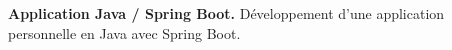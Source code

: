 
\begin{cvparagraph}
\noindent\textbf{Application Java / Spring Boot.} Développement d’une application personnelle en Java avec Spring Boot.
\end{cvparagraph}
